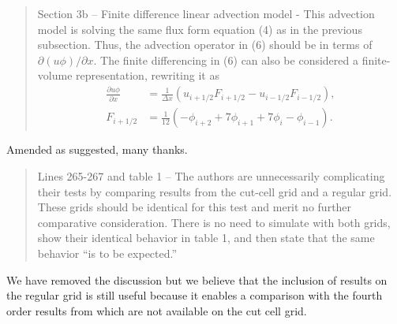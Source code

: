 \documentclass{article}
\begin{document}
\begin{quotation}
	Section 3b -- Finite difference linear advection model - This advection model is solving the same flux form equation (4) as in the previous subsection. Thus, the advection operator in (6) should be in terms of $\partial (u\phi)/\partial x$.  The finite differencing in (6) can also be considered a finite-volume representation, rewriting it as 
	\begin{align*}
		\frac{\partial u \phi}{\partial x} &= \frac{1}{\Delta x} \left( u_{i+1/2} F_{i+1/2} - u_{i - 1/2} F_{i - 1/2}\right), \\
		F_{i+1/2} &= \frac{1}{12} \left( - \phi_{i+2} + 7 \phi_{i+1} + 7 \phi_i - \phi_{i-1} \right).
	\end{align*}
\end{quotation}
Amended as suggested, many thanks.

\begin{quotation}
 Lines 265-267 and table 1 -- The authors are unnecessarily complicating their tests  by comparing results from the cut-cell grid and a regular grid. These grids should be identical for this test and merit no further comparative consideration. There is no need to simulate with both grids, show their identical behavior in table 1, and then  state that the same behavior ``is to be expected.''
\end{quotation}
We have removed the discussion but we believe that the inclusion of results on the regular grid is still useful because it enables a comparison with the fourth order results from \citet{schaer2002} which are not available on the cut cell grid.
\end{document}
